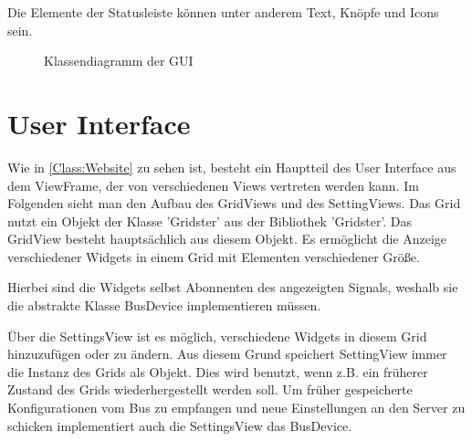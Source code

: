 \documentclass[entwurf.tex]{subfiles}
\begin{document}
		Die Elemente der Statusleiste können unter anderem Text, Knöpfe und Icons sein.
		\begin{figure}[H]
  			\begin{center}
  				\caption{Klassendiagramm der GUI}
  			\end{center}
  		\end{figure}  	
  	
  	\newpage
  	\section{User Interface}
		Wie in \ref{Class:Website} zu sehen ist, besteht ein Hauptteil des User Interface aus dem ViewFrame, der von verschiedenen Views vertreten werden kann. Im Folgenden sieht man den Aufbau des GridViews und des SettingViews. Das Grid nutzt ein Objekt der Klasse 'Gridster' aus der Bibliothek 'Gridster'. Das GridView besteht hauptsächlich aus diesem Objekt. Es ermöglicht die Anzeige verschiedener Widgets in einem Grid mit Elementen verschiedener Größe.
		
		Hierbei sind die Widgets selbst Abonnenten des angezeigten Signals, weshalb sie die abstrakte Klasse BusDevice implementieren müssen.
		
		Über die SettingsView ist es möglich, verschiedene Widgets in diesem Grid hinzuzufügen oder zu ändern. Aus diesem Grund speichert SettingView immer die Instanz des Grids als Objekt. Dies wird benutzt, wenn z.B. ein früherer Zustand des Grids wiederhergestellt werden soll. Um früher gespeicherte Konfigurationen vom Bus zu empfangen und neue Einstellungen an den Server zu schicken implementiert auch die SettingsView das BusDevice. 
		
\end{document}
